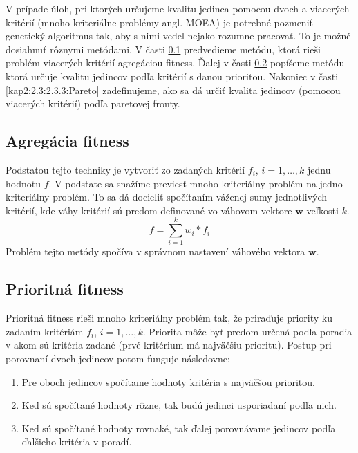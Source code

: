 V prípade úloh, pri ktorých určujeme kvalitu jedinca pomocou dvoch a viacerých kritérií (mnoho kriteriálne problémy angl. MOEA) je potrebné pozmeniť genetický algoritmus tak, aby s nimi vedel nejako rozumne pracovať. To je možné dosiahnuť rôznymi metódami.
V časti \ref{kap2:2.3:2.3.1:Weighted} predvedieme metódu, ktorá rieši problém viacerých kritérií agregáciou fitness. Ďalej v časti \ref{kap2:2.3:2.3.2:Priority} popíšeme metódu ktorá určuje kvalitu jedincov podľa kritérií s danou prioritou. Nakoniec v časti \ref{kap2:2.3:2.3.3:Pareto} zadefinujeme, ako sa dá určiť kvalita jedincov (pomocou viacerých kritérií) podľa paretovej fronty.

\subsection{Agregácia fitness}\label{kap2:2.3:2.3.1:Weighted}
Podstatou tejto techniky je vytvoriť zo zadaných kritérií $f_{i}$, $i=1,\ldots,k$ jednu hodnotu $f$. V podstate sa snažíme previesť mnoho kriteriálny problém na jedno kriteriálny problém. To sa dá docieliť spočítaním váženej sumy jednotlivých kritérií, kde váhy kritérií sú predom definované vo váhovom vektore $\mathbf{w}$ veľkosti $k$.
\begin{equation}
f = \sum_{i=1}^{k} w_{i} * f_{i} \nonumber
\end{equation}
Problém tejto metódy spočíva v správnom nastavení váhového vektora $\mathbf{w}$.
\subsection{Prioritná fitness}\label{kap2:2.3:2.3.2:Priority}
Prioritná fitness rieši mnoho kriteriálny problém tak, že priraďuje priority ku zadaním kritériám $f_{i}$, $i=1,\ldots,k$. Priorita môže byť predom určená podľa poradia v akom sú kritéria zadané (prvé kritérium má najväčšiu prioritu). Postup pri porovnaní dvoch jedincov potom funguje následovne:
\begin{enumerate}
\item Pre oboch jedincov spočítame hodnoty kritéria s najväčšou prioritou.
\item Keď sú spočítané hodnoty rôzne, tak budú jedinci usporiadaní podľa nich.
\item Keď sú spočítané hodnoty rovnaké, tak ďalej porovnávame jedincov podľa ďalšieho kritéria v poradí.
\end{enumerate}

